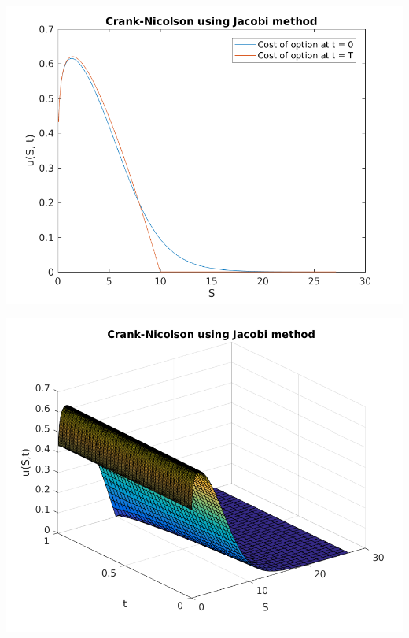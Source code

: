 \documentclass{article}
\begin{document}
\includegraphics{"q2_13"}
\pagebreak


\includegraphics{"q2_14"}
\pagebreak
\end{document}

